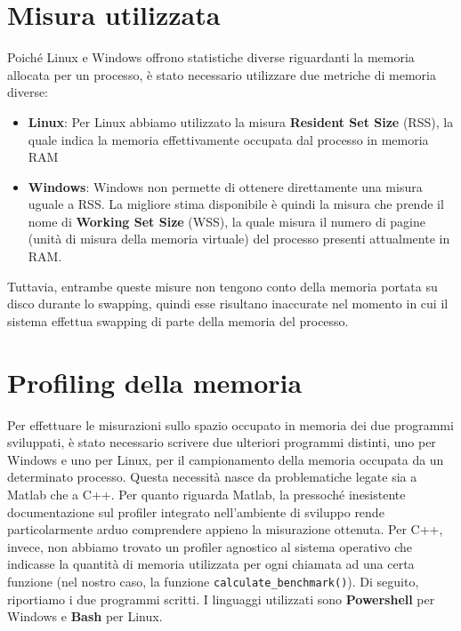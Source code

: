 \section{Misura utilizzata}
\label{mem_mesuring_method}
Poiché Linux e Windows offrono statistiche diverse riguardanti la memoria allocata per un processo, è stato
necessario utilizzare due metriche di memoria diverse:
\begin{itemize}
    \item \textbf{Linux}: Per Linux abbiamo utilizzato la misura \textbf{Resident Set Size} (RSS), la quale indica la memoria effettivamente occupata dal processo in memoria RAM
    \item \textbf{Windows}: Windows non permette di ottenere direttamente una misura uguale a RSS. La migliore stima disponibile è quindi la misura che prende il nome di \textbf{Working Set Size} (WSS),
    la quale misura il numero di pagine (unità di misura della memoria virtuale) del processo presenti attualmente in RAM.
\end{itemize}
Tuttavia, entrambe queste misure non tengono conto della memoria portata su disco durante lo swapping, quindi esse risultano inaccurate nel momento in cui il sistema effettua swapping di parte
della memoria del processo.
\section{Profiling della memoria}
Per effettuare le misurazioni sullo spazio occupato in memoria dei due programmi sviluppati,
è stato necessario scrivere due ulteriori programmi distinti, uno per Windows e uno per Linux, per il campionamento della memoria occupata da un
determinato processo.
Questa necessità nasce da problematiche legate sia a Matlab che a C++.
Per quanto riguarda Matlab, la pressoché inesistente documentazione sul profiler integrato nell'ambiente di sviluppo \cite{mathworks_profiling}
rende particolarmente arduo comprendere appieno la misurazione ottenuta. 
Per C++, invece, non abbiamo trovato un profiler agnostico al sistema operativo che indicasse la quantità di memoria utilizzata per ogni chiamata
ad una certa funzione (nel nostro caso, la funzione \texttt{calculate\_benchmark()}).
Di seguito, riportiamo i due programmi scritti. I linguaggi utilizzati sono \textbf{Powershell} per Windows e \textbf{Bash} per Linux.

\clearpage

